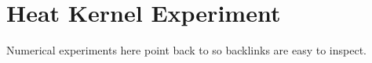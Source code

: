 
\section{Heat Kernel Experiment}

Numerical experiments here point back to  so backlinks are
easy to inspect.
